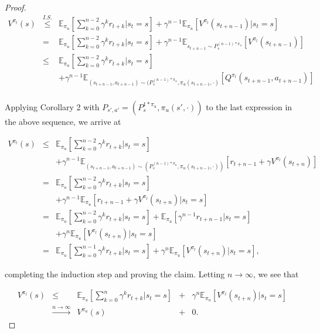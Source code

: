 \documentclass[11pt]{article} %
\begin{document}
\begin{proof}
	\[
		\begin{array}{rll}
			V^{\pi_l}(s) & \overset{I.S.}{\le} & \mathbb{E}_{\pi_u}[\sum_{k=0}^{n-2} \gamma^k r_{t+k} | s_t = s] + \gamma^{n-1} \mathbb{E}_{\pi_u}[V^{\pi_l}(s_{t+n-1}) | s_t = s] \\
			& = & \mathbb{E}_{\pi_u}[\sum_{k=0}^{n-2} \gamma^k r_{t+k} | s_t = s] + \gamma^{n-1} \mathbb{E}_{s_{t+n-1} \sim P_s^{(n-1)*\pi_u}}[V^{\pi_l}(s_{t+n-1})] \\
			& \le & \mathbb{E}_{\pi_u}[\sum_{k=0}^{n-2} \gamma^k r_{t+k} | s_t = s] \\
			&  	& + \gamma^{n-1} \mathbb{E}_{(s_{t+n-1},a_{t+n-1}) \sim (P_s^{(n-1)*\pi_u},\pi_u(s_{t+n-1},\cdot)}[Q^{\pi_l}(s_{t+n-1},a_{t+n-1})] \\
		\end{array}
	\]

	Applying Corollary 2 with $P_{s',a'} = (P_s^{1 * \pi_u}, \pi_u(s',\cdot))$  to the last expression in the above sequence, we arrive at
	
	\[
		\begin{array}{rll}
		V^{\pi_l}(s) 	&	\le 	 & \mathbb{E}_{\pi_u}[\sum_{k=0}^{n-2} \gamma^k r_{t+k} | s_t = s] \\
					&		& + \gamma^{n-1} \mathbb{E}_{(s_{t+n-1},a_{t+n-1}) \sim (P_s^{(n-1)*\pi_u},\pi_u(s_{t+n-1},\cdot))}[r_{t+n-1} + \gamma V^{\pi_l}(s_{t+n})] \\
				 & = & \mathbb{E}_{\pi_u}[\sum_{k=0}^{n-2} \gamma^k r_{t+k} | s_t = s] \\
				& 	& + \gamma^{n-1} \mathbb{E}_{\pi_u}[r_{t+n-1} + \gamma V^{\pi_l}(s_{t+n}) | s_t = s] \\
				 & = & \mathbb{E}_{\pi_u}[\sum_{k=0}^{n-2} \gamma^k r_{t+k} | s_t = s]  + \mathbb{E}_{\pi_u}[\gamma^{n-1} r_{t+n-1} | s_t = s] \\
				&	& + \gamma^n \mathbb{E}_{\pi_u}[V^{\pi_l}(s_{t+n}) | s_t = s] \\
				& = & \mathbb{E}_{\pi_u}[\sum_{k=0}^{n-1} \gamma^k r_{t+k} | s_t = s] + \gamma^n \mathbb{E}_{\pi_u}[V^{\pi_l}(s_{t+n}) | s_t = s],
		\end{array}
	\]

	completing the induction step and proving the claim. Letting $n \rightarrow \infty$, we see that

	\[
		\begin{array}{rclcl}
			V^{\pi_l}(s) & \le & \mathbb{E}_{\pi_u}[\sum_{k=0}^{n} \gamma^k r_{t+k} | s_t = s] & + & \gamma^{n} \mathbb{E}_{\pi_u}[V^{\pi_l}(s_{t+n}) | s_t = s ] \\
						& \overset{n \rightarrow \infty}{\rightarrow } & V^{\pi_u}(s) & + & 0.
		\end{array}
	\]


\end{proof}
\end{document}
